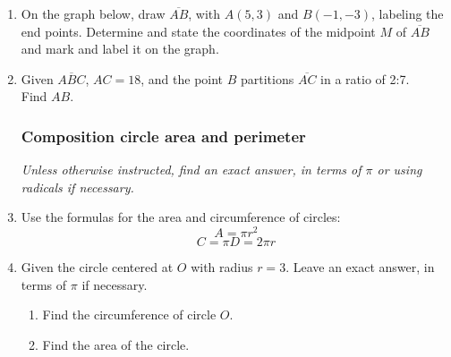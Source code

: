 \begin{enumerate}
\item On the graph below, draw $\overline{AB}$, with $A(5,3)$ and $B(-1,-3)$, labeling the end points. Determine and state the coordinates of the midpoint $M$ of $\overline{AB}$ and mark and label it on the graph.\\
  \vspace{0.5cm}

\item Given $\overline{ABC}$, $AC=18$, and the point $B$ partitions $\overline{AC}$ in a ratio of 2:7.\\[0.5cm] Find ${AB}$. \\[1.5cm]

\newpage
\subsubsection*{Composition circle area and perimeter}
\emph{Unless otherwise instructed, find an exact answer, in terms of $\pi$ or using radicals if necessary.}

\item Use the formulas for the area and circumference of circles:
\[A=\pi r^2\]
\[C=\pi D = 2\pi r\]

\item Given the circle centered at $O$ with radius $r=3$. Leave an exact answer, in terms of $\pi$ if necessary.
\begin{multicols}{2}
  \begin{enumerate}
    \item Find the circumference of circle $O$. %
    \item Find the area of the circle.\vspace{2cm}
  \end{enumerate}
\end{multicols}


\end{enumerate}
